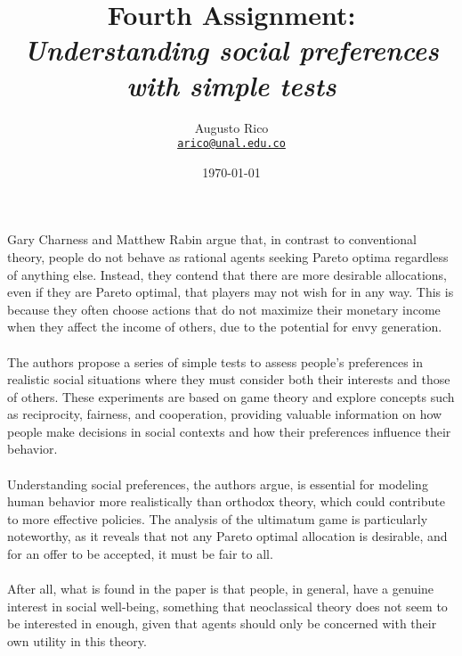 \documentclass[11pt]{article}
\title{Fourth Assignment: \\\textbf{\textit{Understanding social preferences with simple tests}}}
\author{Augusto Rico\\%
    \href{mailto:arico@unal.edu.co}{\texttt{arico@unal.edu.co}}
    }
\date{\today}
\begin{document}
\maketitle


\begin{flushleft}
    Gary Charness and Matthew Rabin argue that, in contrast to conventional theory, people do not behave as rational agents seeking Pareto optima regardless of anything else. Instead, they contend that there are more desirable allocations, even if they are Pareto optimal, that players may not wish for in any way. This is because they often choose actions that do not maximize their monetary income when they affect the income of others, due to the potential for envy generation.\\~\\

    The authors propose a series of simple tests to assess people's preferences in realistic social situations where they must consider both their interests and those of others. These experiments are based on game theory and explore concepts such as reciprocity, fairness, and cooperation, providing valuable information on how people make decisions in social contexts and how their preferences influence their behavior.\\~\\
    
    Understanding social preferences, the authors argue, is essential for modeling human behavior more realistically than orthodox theory, which could contribute to more effective policies. The analysis of the ultimatum game is particularly noteworthy, as it reveals that not any Pareto optimal allocation is desirable, and for an offer to be accepted, it must be fair to all.\\~\\
    
    After all, what is found in the paper is that people, in general, have a genuine interest in social well-being, something that neoclassical theory does not seem to be interested in enough, given that agents should only be concerned with their own utility in this theory.\\~\\
    

\end{flushleft}
\end{document}
